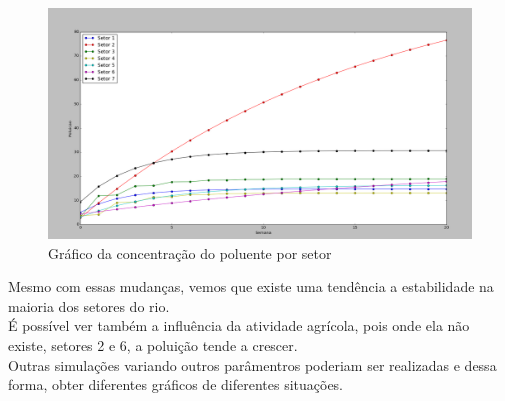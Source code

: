 \documentclass[a4paper]{article}
\begin{document}
\begin{enumerate}
\begin{figure}[h]
\centering
\caption{Gr\'afico da concentra\c{c}\~ao do poluente por setor}
\includegraphics[scale=0.25]{simulacao2.png}
\end{figure}
\newpage
Mesmo com essas mudan\c{c}as, vemos que existe uma tend\^encia a estabilidade na maioria dos setores do rio.
\\
\'E poss\'ivel ver tamb\'em a influ\^encia da atividade agr\'icola, pois onde ela n\~ao existe, setores 2 e 6, a polui\c{c}\~ao tende a crescer.
\\
Outras simula\c{c}\~oes variando outros par\^amentros poderiam ser realizadas e dessa forma, obter diferentes gr\'aficos de diferentes situa\c{c}\~oes.
\\



\end{enumerate}
\end{document}
